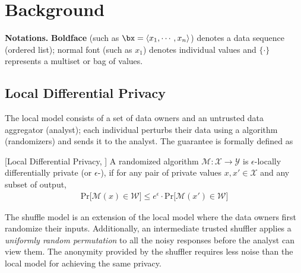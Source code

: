 \section{Background}\label{sec:background} 
\textbf{Notations.} \textbf{Boldface} (such as $\bx=\langle x_1, 
 \cdots, x_n\rangle$) denotes a data sequence (ordered list); normal font (such as $x_1$) denotes individual values and $\{\cdot\}$ represents a multiset or bag of values.\vspace{-0.3cm}
\subsection{Local Differential Privacy}\label{sec:ldp}
 \vspace{-0.2cm}The local model consists of a set of data owners and an untrusted data aggregator (analyst); each individual perturbs their data using a \ldp algorithm (randomizers) and sends it to the analyst. %
The \ldp guarantee is formally defined as
\begin{defn}\vspace{-0.1cm}[Local Differential Privacy, \ldp \cite{Warner,Evfimievski:2003:LPB:773153.773174,Kasivi}]
 A randomized algorithm $\mathcal{M} : \mathcal{X} \rightarrow \mathcal{Y}$ is $\epsilon$-locally differentially private (or $\epsilon$-\ldp), if for any pair of private values $x, x' \in \mathcal{X}$ and any subset of output, %
 \begin{gather}
 \mathrm{Pr}\big[\mathcal{M}(x) \in \mathcal{W}\big] \leq e^{\epsilon} \cdot \mathrm{Pr}\big[\mathcal{M}(x') \in \mathcal{W}  \big]
  \end{gather}
  \end{defn}
The shuffle model is an extension of the local model where the data owners first randomize their inputs. Additionally, an intermediate trusted shuffler applies a \textit{uniformly random permutation} to all the noisy responses before the analyst can view them. The anonymity provided by the shuffler requires less noise than the local model for achieving the same
privacy.  

